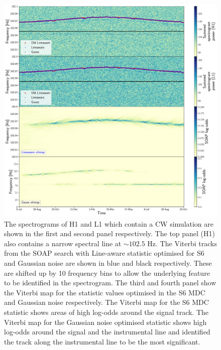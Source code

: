 \begin{figure}[h]
    \centering
    \includegraphics[width=1.0\linewidth]{C3_soap/line_example.pdf}
	\caption[Example of improvements when using optimised parameters for line aware statistic.]{ The spectrograms of H1 and L1 which contain a \gls{CW} simulation are shown in the first and second panel respectively. The top panel (H1) also contains a narrow spectral line at $\sim 102.5$ Hz.
	The Viterbi tracks from the SOAP search with Line-aware statistic optimised for S6 and Gaussian noise are shown in blue and black respectively. These are shifted up by 10 frequency bins to allow the underlying feature to be identified in the spectrogram. The third and fourth panel show the Viterbi map for the statistic values optimised in the S6 MDC and Gaussian noise respectively. The Viterbi map for the S6 \gls{MDC} statistic shows areas of high log-odds around the signal track. The Viterbi map for the Gaussian noise optimised statistic shows high log-odds around the signal and the instrumental line and identified the track along the instrumental line to be the most significant.}
    \label{soap:las:optimisation:vitexample}
\end{figure}

